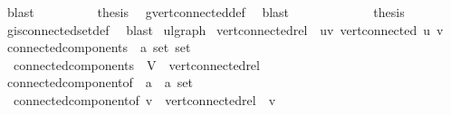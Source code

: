 \begin{isabellebody}
\ blast\isanewline
\ \ \ \ \ \ \isamarkupfalse%
\ \isamarkupfalse%
\ {\isacharquery}{\kern0pt}thesis\ \isamarkupfalse%
\ g{\isacharprime}{\kern0pt}{\isachardot}{\kern0pt}vert{\isacharunderscore}{\kern0pt}connected{\isacharunderscore}{\kern0pt}def\ \isamarkupfalse%
\ blast\isanewline
\ \ \ \ \isamarkupfalse%
\isanewline
\ \ \isamarkupfalse%
\isanewline
\ \ \isamarkupfalse%
\ \isamarkupfalse%
\ {\isacharquery}{\kern0pt}thesis\ \isamarkupfalse%
\ g{\isacharprime}{\kern0pt}{\isachardot}{\kern0pt}is{\isacharunderscore}{\kern0pt}connected{\isacharunderscore}{\kern0pt}set{\isacharunderscore}{\kern0pt}def\ \isamarkupfalse%
\ blast\isanewline
{}\isamarkupfalse%
%
\endisatagproof
{\isafoldproof}%
%
\isadelimproof
%
\endisadelimproof
%
\isadelimdocument
%
\endisadelimdocument
%
\isatagdocument
%
\isamarkuptrue%
%
\endisatagdocument
{\isafolddocument}%
%
\isadelimdocument
%
\endisadelimdocument
{}\isamarkupfalse%
\ ulgraph\isanewline
{}\isanewline
\isanewline
{}\isamarkupfalse%
\ {\isachardoublequoteopen}vert{\isacharunderscore}{\kern0pt}connected{\isacharunderscore}{\kern0pt}rel\ {\isasymequiv}\ {\isacharbraceleft}{\kern0pt}{\isacharparenleft}{\kern0pt}u{\isacharcomma}{\kern0pt}v{\isacharparenright}{\kern0pt}{\isachardot}{\kern0pt}\ vert{\isacharunderscore}{\kern0pt}connected\ u\ v{\isacharbraceright}{\kern0pt}{\isachardoublequoteclose}\isanewline
\isanewline
{}\isamarkupfalse%
\ connected{\isacharunderscore}{\kern0pt}components\ {\isacharcolon}{\kern0pt}{\isacharcolon}{\kern0pt}\ {\isachardoublequoteopen}{\isacharprime}{\kern0pt}a\ set\ set{\isachardoublequoteclose}\ \isanewline
\ \ {\isachardoublequoteopen}connected{\isacharunderscore}{\kern0pt}components\ {\isacharequal}{\kern0pt}\ V\ {\isacharslash}{\kern0pt}{\isacharslash}{\kern0pt}\ vert{\isacharunderscore}{\kern0pt}connected{\isacharunderscore}{\kern0pt}rel{\isachardoublequoteclose}\isanewline
\isanewline
{}\isamarkupfalse%
\ connected{\isacharunderscore}{\kern0pt}component{\isacharunderscore}{\kern0pt}of\ {\isacharcolon}{\kern0pt}{\isacharcolon}{\kern0pt}\ {\isachardoublequoteopen}{\isacharprime}{\kern0pt}a\ {\isasymRightarrow}\ {\isacharprime}{\kern0pt}a\ set{\isachardoublequoteclose}\ \isanewline
\ \ {\isachardoublequoteopen}connected{\isacharunderscore}{\kern0pt}component{\isacharunderscore}{\kern0pt}of\ v\ {\isacharequal}{\kern0pt}\ vert{\isacharunderscore}{\kern0pt}connected{\isacharunderscore}{\kern0pt}rel\ {\isacharbackquote}{\kern0pt}{\isacharbackquote}{\kern0pt}\ {\isacharbraceleft}{\kern0pt}v{\isacharbraceright}{\kern0pt}{\isachardoublequoteclose}\isanewline

\end{isabellebody}
